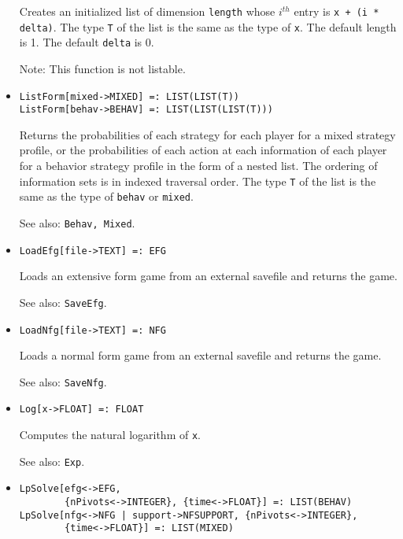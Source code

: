 \begin{itemize}
\bd Creates an initialized list of dimension \verb+length+ whose
$i^{th}$ entry is \verb&x + (i * delta)&.  The type \verb+T+ of the list is
the same as the type of \verb+x+.  The default length is 1. The
default \verb+delta+ is 0.   
\item
[Note:] This function is not listable.
\ed

\item
\protect \large \begin{verbatim}
ListForm[mixed->MIXED] =: LIST(LIST(T))
ListForm[behav->BEHAV] =: LIST(LIST(LIST(T)))
\end{verbatim}\normalsize

\bd Returns the probabilities of each strategy for each player for a
mixed strategy profile, or the probabilities of each action at each
information of each player for a behavior strategy profile in the form
of a nested list.  The ordering of information sets is in indexed
traversal order.  The type \verb+T+ of the list is the same as the
type of \verb+behav+ or \verb+mixed+.
\item
[See also:] {\tt Behav, Mixed}.
\ed

\item
\protect \large \begin{verbatim}
LoadEfg[file->TEXT] =: EFG
\end{verbatim}\normalsize

\bd
Loads an extensive form game from an external savefile
and returns the game.
\item
[See also:] {\tt SaveEfg}.
\ed

\item
\protect \large \begin{verbatim}
LoadNfg[file->TEXT] =: NFG
\end{verbatim}\normalsize

\bd
Loads a normal form game from an external savefile
and returns the game.  
\item
[See also:] {\tt SaveNfg}.
\ed

\item
\protect \large \begin{verbatim}
Log[x->FLOAT] =: FLOAT
\end{verbatim} \normalsize

\bd
Computes the natural logarithm of \verb+x+.
\item
[See also:] {\tt Exp}.
\ed

\item
\protect \large \begin{verbatim}
LpSolve[efg<->EFG,
        {nPivots<->INTEGER}, {time<->FLOAT}] =: LIST(BEHAV)
LpSolve[nfg<->NFG | support->NFSUPPORT, {nPivots<->INTEGER},
        {time<->FLOAT}] =: LIST(MIXED)
\end{verbatim}\normalsize


\end{itemize}
